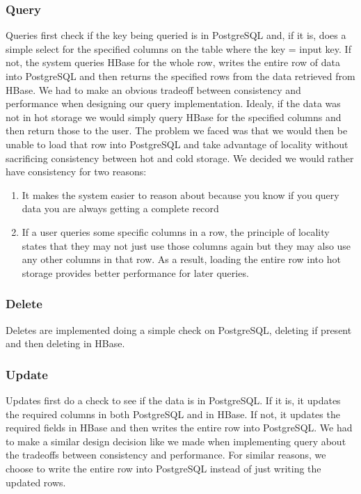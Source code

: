 \documentclass[12pt]{article}
\begin{document}
\subsubsection{Query}
Queries first check if the key being queried is in PostgreSQL and, if it is, does a simple select for the specified columns on the table where the key = input key. If not, the system queries HBase for the whole row, writes the entire row of data into PostgreSQL and then returns the specified rows from the data retrieved from HBase. 
We had to make an obvious tradeoff between consistency and performance when designing our query implementation. Idealy, if the data was not in hot storage we would simply query HBase for the specified columns and then return those to the user. The problem we faced was that we would then be unable to load that row into PostgreSQL and take advantage of locality without sacrificing consistency between hot and cold storage. We decided we would rather have consistency for two reasons:

\begin{enumerate}
  \item It makes the system easier to reason about because you know if you query data you are always getting a complete record
  \item If a user queries some specific columns in a row, the principle of locality states that they may not just use those columns again but they may also use any other columns in that row. As a result, loading the entire row into hot storage provides better performance for later queries.
\end{enumerate}

\subsubsection{Delete}
Deletes are implemented doing a simple check on PostgreSQL, deleting if present and then deleting in HBase. 

\subsubsection{Update}
Updates first do a check to see if the data is in PostgreSQL. If it is, it updates the required columns in both PostgreSQL and in HBase. If not, it updates the required fields in HBase and then writes the entire row into PostgreSQL. We had to make a similar design decision like we made when implementing query about the tradeoffs between consistency and performance. For similar reasons, we choose to write the entire row into PostgreSQL instead of just writing the updated rows.
\end{document}
